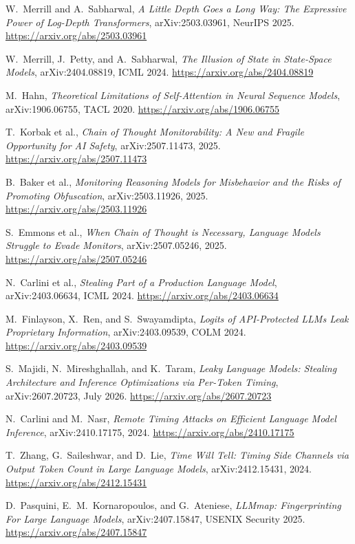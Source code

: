 \documentclass[11pt,letterpaper]{article}
\begin{document}
\begin{enumerate}[label={\textcolor{deepindigo}{[\arabic*]}}, leftmargin=2.6em, itemsep=0.3em]
  \item W.~Merrill and A.~Sabharwal, \emph{A Little Depth Goes a Long Way: The Expressive Power of Log-Depth Transformers}, arXiv:2503.03961, NeurIPS 2025. \url{https://arxiv.org/abs/2503.03961}
  \item W.~Merrill, J.~Petty, and A.~Sabharwal, \emph{The Illusion of State in State-Space Models}, arXiv:2404.08819, ICML 2024. \url{https://arxiv.org/abs/2404.08819}
  \item M.~Hahn, \emph{Theoretical Limitations of Self-Attention in Neural Sequence Models}, arXiv:1906.06755, TACL 2020. \url{https://arxiv.org/abs/1906.06755}
  \item T.~Korbak et al., \emph{Chain of Thought Monitorability: A New and Fragile Opportunity for AI Safety}, arXiv:2507.11473, 2025. \url{https://arxiv.org/abs/2507.11473}
  \item B.~Baker et al., \emph{Monitoring Reasoning Models for Misbehavior and the Risks of Promoting Obfuscation}, arXiv:2503.11926, 2025. \url{https://arxiv.org/abs/2503.11926}
  \item S.~Emmons et al., \emph{When Chain of Thought is Necessary, Language Models Struggle to Evade Monitors}, arXiv:2507.05246, 2025. \url{https://arxiv.org/abs/2507.05246}
  \item N.~Carlini et al., \emph{Stealing Part of a Production Language Model}, arXiv:2403.06634, ICML 2024. \url{https://arxiv.org/abs/2403.06634}
  \item M.~Finlayson, X.~Ren, and S.~Swayamdipta, \emph{Logits of API-Protected LLMs Leak Proprietary Information}, arXiv:2403.09539, COLM 2024. \url{https://arxiv.org/abs/2403.09539}
  \item S.~Majidi, N.~Mireshghallah, and K.~Taram, \emph{Leaky Language Models: Stealing Architecture and Inference Optimizations via Per-Token Timing}, arXiv:2607.20723, July 2026. \url{https://arxiv.org/abs/2607.20723}
  \item N.~Carlini and M.~Nasr, \emph{Remote Timing Attacks on Efficient Language Model Inference}, arXiv:2410.17175, 2024. \url{https://arxiv.org/abs/2410.17175}
  \item T.~Zhang, G.~Saileshwar, and D.~Lie, \emph{Time Will Tell: Timing Side Channels via Output Token Count in Large Language Models}, arXiv:2412.15431, 2024. \url{https://arxiv.org/abs/2412.15431}
  \item D.~Pasquini, E.~M.~Kornaropoulos, and G.~Ateniese, \emph{LLMmap: Fingerprinting For Large Language Models}, arXiv:2407.15847, USENIX Security 2025. \url{https://arxiv.org/abs/2407.15847}

\end{enumerate}
\end{document}
